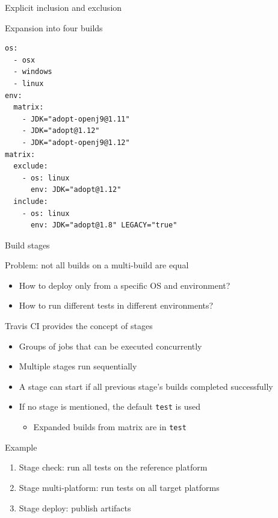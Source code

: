 \documentclass[presentation]{beamer}
\begin{document}
\begin{frame}[fragile]{Explicit inclusion and exclusion}
    \begin{block}{Expansion into four builds}
        \begin{verbatim}
os:
  - osx
  - windows
  - linux
env:
  matrix:
    - JDK="adopt-openj9@1.11"
    - JDK="adopt@1.12"
    - JDK="adopt-openj9@1.12"
matrix:
  exclude:
    - os: linux
      env: JDK="adopt@1.12"
  include:
    - os: linux
      env: JDK="adopt@1.8" LEGACY="true"
        \end{verbatim}
    \end{block}
\end{frame}

\begin{frame}{Build stages}
    \begin{block}{Problem: not all builds on a multi-build are equal}
        \begin{itemize}
            \item How to deploy only from a specific OS and environment?
            \item How to run different tests in different environments?
        \end{itemize}
    \end{block}
    Travis CI provides the concept of stages
    \begin{itemize}
        \item Groups of jobs that can be executed concurrently
        \item Multiple stages run sequentially
        \item A stage can start if all previous stage's builds completed successfully
        \item If no stage is mentioned, the default \texttt{test} is used
        \begin{itemize}
            \item Expanded builds from matrix are in \texttt{test}
        \end{itemize}
    \end{itemize}
    \begin{block}{Example}
        \begin{enumerate}
            \item Stage check: run all tests on the reference platform
            \item Stage multi-platform: run tests on all target platforms
            \item Stage deploy: publish artifacts
        \end{enumerate}
    \end{block}
\end{frame}
\end{document}
